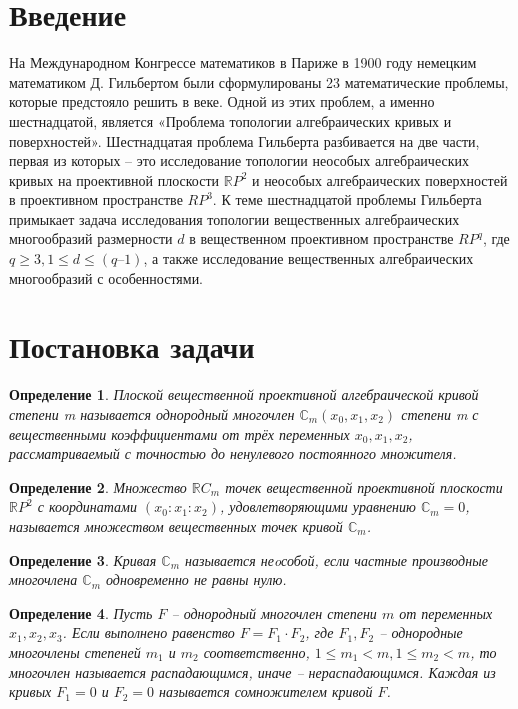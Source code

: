 \documentclass[14pt]{article}
\newtheorem{definition}{Определение}
\newcommand{\RomanNumeralCaps}[1]
    {\MakeUppercase{\romannumeral #1}}
\begin{document}
\newpage
\section{Введение}


        На \RomanNumeralCaps{2} Международном Конгрессе математиков в Париже в 1900 году немецким математиком Д. Гильбертом были сформулированы 23 математические проблемы, которые предстояло решить в \RomanNumeralCaps{20} веке. Одной из этих проблем, а именно шестнадцатой, является «Проблема топологии алгебраических кривых и поверхностей». Шестнадцатая проблема Гильберта разбивается на две части, первая из которых – это исследование топологии неособых алгебраических кривых на проективной плоскости $\mathbb RP^2$ и неособых алгебраических поверхностей в проективном пространстве $RP^3$. К теме шестнадцатой проблемы Гильберта примыкает задача исследования топологии вещественных алгебраических многообразий размерности $d$ в вещественном проективном пространстве $RP^q$, где $q \geqslant 3, 1 \leqslant d \leqslant (q–1)$, а также исследование вещественных алгебраических многообразий с особенностями.
\newpage
\section{Постановка задачи}

\begin{definition}
 Плоской вещественной проективной алгебраической кривой степени m называется однородный многочлен $\mathbb C_m(x_0, x_1, x_2)$ степени m с вещественными коэффициентами от трёх переменных $x_0, x_1, x_2$, рассматриваемый с точностью до ненулевого постоянного множителя.
\end{definition}

\begin{definition}
Множество $\mathbb RC_m$ точек вещественной проективной плоскости $\mathbb RP^2$ с координатами $(x_0:x_1:x_2)$, удовлетворяющими уравнению $\mathbb C_m = 0$, называется множеством вещественных точек кривой $\mathbb C_m$.
\end{definition}

\begin{definition}
Кривая $\mathbb C_m$ называется неoсобой, если частные производные многочлена $\mathbb C_m$ одновременно не равны нулю.
\end{definition}

\begin{definition}
Пусть $F$ -- однородный многочлен степени $m$ от переменных $x_1, x_2, x_3$. Если выполнено равенство $F = F_1 \cdot F_2$, где $F_1, F_2$ -- однородные многочлены степеней $m_1$ и $m_2$ соответственно, $1 \leqslant m_1 < m, 1 \leqslant m_2 < m$, то многочлен называется распадающимся, иначе -- нераспадающимся. Каждая из кривых $F_1 = 0$ и $F_2 = 0$ называется сомножителем кривой $F$.
\end{definition}
\end{document}
